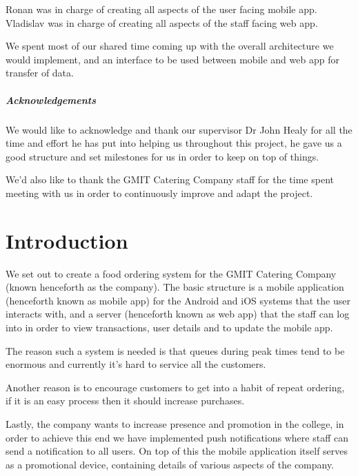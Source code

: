 Ronan was in charge of creating all aspects of the user facing mobile app. 
Vladislav was in charge of creating all aspects of the staff facing web app.

We spent most of our shared time coming up with the overall architecture we would implement, and an interface to be used between mobile and web app for transfer of data.


\pagebreak
\paragraph{Acknowledgements}
We would like to acknowledge and thank our supervisor Dr John Healy for all the time and effort he has put into helping us throughout this project, he gave us a good structure and set milestones for us in order to keep on top of things.
\linebreak

We'd also like to thank the GMIT Catering Company staff for the time spent meeting with us in order to continuously improve and adapt the project.

\chapter{Introduction}	%



We set out to create a food ordering system for the GMIT Catering Company (known henceforth as the company).
The basic structure is a mobile application (henceforth known as mobile app) for the Android and iOS systems that the user interacts with, and a server (henceforth known as web app) that the staff can log into in order to view transactions, user details and to update the mobile app.

The reason such a system is needed is that queues during peak times tend to be enormous and currently it's hard to service all the customers.

Another reason is to encourage customers to get into a habit of repeat ordering, if it is an easy process then it should increase purchases.

Lastly, the company wants to increase presence and promotion in the college, in order to achieve this end we have implemented push notifications where staff can send a notification to all users. On top of this the mobile application itself serves as a promotional device, containing details of various aspects of the company.
\linebreak

